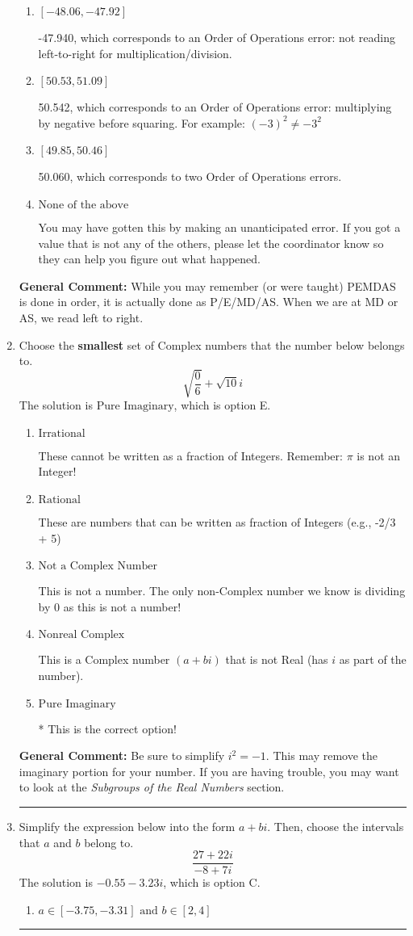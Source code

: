 \documentclass{extbook}[14pt]
\newcommand{\litem}[1]{\item #1

\rule{\textwidth}{0.4pt}}
\begin{document}
\begin{enumerate}
{\begin{enumerate}[label=\Alph*.]
* -47.458, this is the correct option
\item \( [-48.06, -47.92] \)

 -47.940, which corresponds to an Order of Operations error: not reading left-to-right for multiplication/division.
\item \( [50.53, 51.09] \)

 50.542, which corresponds to an Order of Operations error: multiplying by negative before squaring. For example: $(-3)^2 \neq -3^2$
\item \( [49.85, 50.46] \)

 50.060, which corresponds to two Order of Operations errors.
\item \( \text{None of the above} \)

 You may have gotten this by making an unanticipated error. If you got a value that is not any of the others, please let the coordinator know so they can help you figure out what happened.
\end{enumerate}

\textbf{General Comment:} While you may remember (or were taught) PEMDAS is done in order, it is actually done as P/E/MD/AS. When we are at MD or AS, we read left to right.
}
\litem{
Choose the \textbf{smallest} set of Complex numbers that the number below belongs to.
\[ \sqrt{\frac{0}{6}}+\sqrt{10}i \]The solution is \( \text{Pure Imaginary} \), which is option E.\begin{enumerate}[label=\Alph*.]
\item \( \text{Irrational} \)

These cannot be written as a fraction of Integers. Remember: $\pi$ is not an Integer!
\item \( \text{Rational} \)

These are numbers that can be written as fraction of Integers (e.g., -2/3 + 5)
\item \( \text{Not a Complex Number} \)

This is not a number. The only non-Complex number we know is dividing by 0 as this is not a number!
\item \( \text{Nonreal Complex} \)

This is a Complex number $(a+bi)$ that is not Real (has $i$ as part of the number).
\item \( \text{Pure Imaginary} \)

* This is the correct option!
\end{enumerate}

\textbf{General Comment:} Be sure to simplify $i^2 = -1$. This may remove the imaginary portion for your number. If you are having trouble, you may want to look at the \textit{Subgroups of the Real Numbers} section.
}
\litem{
Simplify the expression below into the form $a+bi$. Then, choose the intervals that $a$ and $b$ belong to.
\[ \frac{27 + 22 i}{-8 + 7 i} \]The solution is \( -0.55  - 3.23 i \), which is option C.\begin{enumerate}[label=\Alph*.]
\item \( a \in [-3.75, -3.31] \text{ and } b \in [2, 4] \)


\end{enumerate}}
\end{enumerate}
\end{document}
